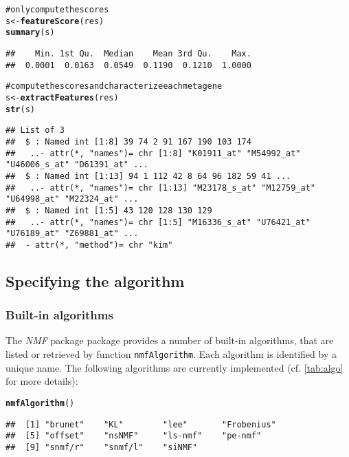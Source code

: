 \documentclass[a4paper]{article}\usepackage{graphicx, color}
\makeatletter
\newcommand{\hlfunctioncall}[1]{\textcolor[rgb]{0.501960784313725,0,0.329411764705882}{\textbf{#1}}}%
\newcommand{\hlcomment}[1]{\textcolor[rgb]{0.180392156862745,0.6,0.341176470588235}{#1}}%
\newenvironment{kframe}{%
 \def\at@end@of@kframe{}%
 \ifinner\ifhmode%
  \def\at@end@of@kframe{\end{minipage}}%
  \begin{minipage}{\columnwidth}%
 \fi\fi%
 \def\FrameCommand##1{\hskip\@totalleftmargin \hskip-\fboxsep
 \colorbox{shadecolor}{##1}\hskip-\fboxsep
     \hskip-\linewidth \hskip-\@totalleftmargin \hskip\columnwidth}%
 \MakeFramed {\advance\hsize-\width
   \@totalleftmargin\z@ \linewidth\hsize
   \@setminipage}}%
 {\par\unskip\endMakeFramed%
 \at@end@of@kframe}
\newenvironment{knitrout}{}{} %
\let\code=\texttt
\newcommand{\pkgname}[1]{\textit{#1}\xspace}
\newcommand{\Rpkg}[1]{\pkgname{#1} package\xspace}
\newcommand{\nmfpack}{\Rpkg{NMF}}
\makeatother
\begin{document}
\begin{knitrout}
\color{fgcolor}\begin{kframe}
\begin{alltt}
\hlcomment{# only compute the scores}
s <- \hlfunctioncall{featureScore}(res)
\hlfunctioncall{summary}(s)
\end{alltt}
\begin{verbatim}
##    Min. 1st Qu.  Median    Mean 3rd Qu.    Max. 
##  0.0001  0.0163  0.0549  0.1190  0.1210  1.0000
\end{verbatim}
\begin{alltt}

\hlcomment{# compute the scores and characterize each metagene}
s <- \hlfunctioncall{extractFeatures}(res)
\hlfunctioncall{str}(s)
\end{alltt}
\begin{verbatim}
## List of 3
##  $ : Named int [1:8] 39 74 2 91 167 190 103 174
##   ..- attr(*, "names")= chr [1:8] "K01911_at" "M54992_at" "U46006_s_at" "D61391_at" ...
##  $ : Named int [1:13] 94 1 112 42 8 64 96 182 59 41 ...
##   ..- attr(*, "names")= chr [1:13] "M23178_s_at" "M12759_at" "U64998_at" "M22324_at" ...
##  $ : Named int [1:5] 43 120 128 130 129
##   ..- attr(*, "names")= chr [1:5] "M16336_s_at" "U76421_at" "U76189_at" "Z69881_at" ...
##  - attr(*, "method")= chr "kim"
\end{verbatim}
\end{kframe}
\end{knitrout}


\subsection{Specifying the algorithm}\label{sec:algo}

\subsubsection{Built-in algorithms}
The \nmfpack package provides a number of built-in algorithms, that are listed or retrieved by function \code{nmfAlgorithm}. 
Each algorithm is identified by a unique name.
The following algorithms are currently implemented (cf. \cref{tab:algo} for more details):

\begin{knitrout}
\color{fgcolor}\begin{kframe}
\begin{alltt}
\hlfunctioncall{nmfAlgorithm}()
\end{alltt}
\begin{verbatim}
##  [1] "brunet"    "KL"        "lee"       "Frobenius"
##  [5] "offset"    "nsNMF"     "ls-nmf"    "pe-nmf"   
##  [9] "snmf/r"    "snmf/l"    "siNMF"
\end{verbatim}
\end{kframe}
\end{knitrout}
\end{document}

